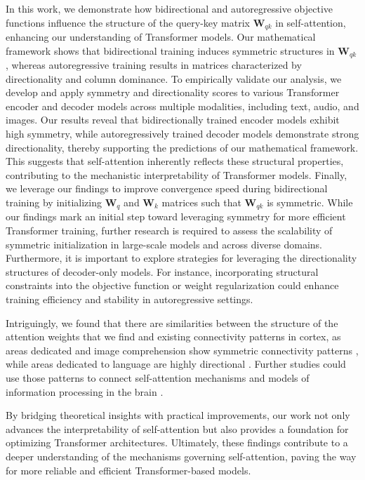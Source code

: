 %
In this work, we demonstrate how bidirectional and autoregressive objective functions influence the structure of the query-key matrix $\bm{W}_{qk}$ in self-attention, enhancing our understanding of Transformer models.
%
Our mathematical framework shows that bidirectional training induces symmetric structures in $\bm{W}_{qk}$, whereas autoregressive training results in matrices characterized by directionality and column dominance.
%
To empirically validate our analysis, we develop and apply symmetry and directionality scores to various Transformer encoder and decoder models across multiple modalities, including text, audio, and images. 
%
Our results reveal that bidirectionally trained encoder models exhibit high symmetry, while autoregressively trained decoder models demonstrate strong directionality, thereby supporting the predictions of our mathematical framework.
%
%
This suggests that self-attention inherently reflects these structural properties, contributing to the mechanistic interpretability of Transformer models.
%
%
Finally, we leverage our findings to improve convergence speed during bidirectional training by initializing $\bm{W}_q$ and  $\bm{W}_k$ matrices such that $\bm{W}_{qk}$ is symmetric.
%
%
While our findings mark an initial step toward leveraging symmetry for more efficient Transformer training, further research is required to assess the scalability of symmetric initialization in large-scale models and across diverse domains.
%
%
Furthermore, it is important to explore strategies for leveraging the directionality structures of decoder-only models.
%
For instance, incorporating structural constraints into the objective function or weight regularization could enhance training efficiency and stability in autoregressive settings.
%

Intriguingly, we found that there are similarities between the structure of the attention weights that we find and existing connectivity patterns in cortex, as areas dedicated and image comprehension show symmetric connectivity patterns  \cite{song2005highly,wang2006heterogeneity}, while areas dedicated to language are highly directional \cite{peng2024directed}. Further studies could use those patterns to connect self-attention mechanisms and models of information processing in the brain \cite{gershman2025key}.

By bridging theoretical insights with practical improvements, our work not only advances the interpretability of self-attention but also provides a foundation for optimizing Transformer architectures.
%
Ultimately, these findings contribute to a deeper understanding of the mechanisms governing self-attention, paving the way for more reliable and efficient Transformer-based models.